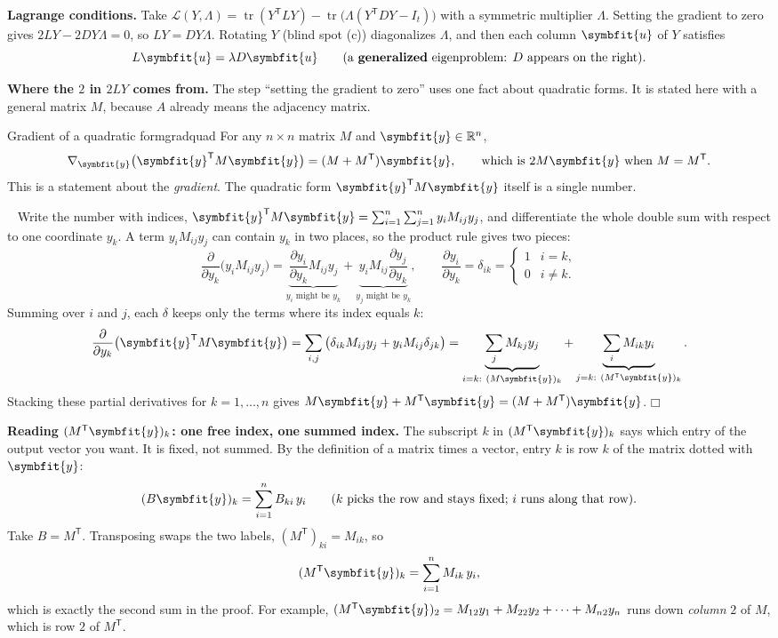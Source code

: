 \documentclass[11pt]{article}
\newcommand{\bm}[1]{\symbfit{#1}}
\newenvironment{proofsketch}{\par\noindent{\itshape Proof.}\ }{\hfill$\mdlgwhtsquare$\par}
\newcommand{\R}{\mathbb{R}}
\newcommand{\vu}{\bm{u}}
\newcommand{\T}{^{\mathsf T}}
\newcommand{\tr}{\operatorname{tr}}
\begin{document}
\textbf{Lagrange conditions.} Take $\mathcal L(Y,\Lambda)=\tr(Y\T LY)-\tr\big(\Lambda(Y\T DY-I_t)\big)$ with a symmetric multiplier
$\Lambda$. Setting the gradient to zero gives $2LY-2DY\Lambda=0$, so $LY=DY\Lambda$. Rotating $Y$ (blind spot (c)) diagonalizes $\Lambda$, and
then each column $\vu$ of $Y$ satisfies
\[
L\vu=\lambda D\vu\qquad(\text{a \textbf{generalized} eigenproblem: } D \text{ appears on the right}).
\]

\textbf{Where the $2$ in $2LY$ comes from.} The step ``setting the gradient to zero'' uses one fact about quadratic forms. It is stated here with a general matrix $M$, because $A$ already means the adjacency matrix.

\begin{proposition}{Gradient of a quadratic form}{gradquad}
For any $n\times n$ matrix $M$ and $\bm y\in\R^n$,
\[
\nabla_{\bm y}\big(\bm y\T M\bm y\big)=(M+M\T)\bm y,\qquad\text{which is } 2M\bm y \text{ when } M=M\T .
\]
This is a statement about the \emph{gradient}. The quadratic form $\bm y\T M\bm y$ itself is a single number.
\end{proposition}
\begin{proofsketch}
Write the number with indices, $\bm y\T M\bm y=\sum_{i=1}^n\sum_{j=1}^ny_iM_{ij}y_j$, and differentiate the whole double sum with respect to one coordinate $y_k$. A term $y_iM_{ij}y_j$ can contain $y_k$ in two places, so the product rule gives two pieces:
\[
\frac{\partial}{\partial y_k}\big(y_iM_{ij}y_j\big)=\underbrace{\frac{\partial y_i}{\partial y_k}M_{ij}y_j}_{y_i\text{ might be }y_k}+\underbrace{y_iM_{ij}\frac{\partial y_j}{\partial y_k}}_{y_j\text{ might be }y_k},
\qquad
\frac{\partial y_i}{\partial y_k}=\delta_{ik}=\begin{cases}1&i=k,\\0&i\ne k.\end{cases}
\]
Summing over $i$ and $j$, each $\delta$ keeps only the terms where its index equals $k$:
\[
\frac{\partial}{\partial y_k}\big(\bm y\T M\bm y\big)=\sum_{i,j}\big(\delta_{ik}M_{ij}y_j+y_iM_{ij}\delta_{jk}\big)
=\underbrace{\sum_jM_{kj}y_j}_{i=k:\ (M\bm y)_k}+\underbrace{\sum_iM_{ik}y_i}_{j=k:\ (M\T\bm y)_k}.
\]
Stacking these partial derivatives for $k=1,\dots,n$ gives $M\bm y+M\T\bm y=(M+M\T)\bm y$.
\end{proofsketch}

\textbf{Reading $(M\T\bm y)_k$: one free index, one summed index.} The subscript $k$ in $(M\T\bm y)_k$ says which entry of the output vector you want. It is fixed, not summed. By the definition of a matrix times a vector, entry $k$ is row $k$ of the matrix dotted with $\bm y$:
\[
(B\bm y)_k=\sum_{i=1}^nB_{ki}\,y_i\qquad(k\text{ picks the row and stays fixed; }i\text{ runs along that row}).
\]
Take $B=M\T$. Transposing swaps the two labels, $(M\T)_{ki}=M_{ik}$, so
\[
(M\T\bm y)_k=\sum_{i=1}^nM_{ik}\,y_i ,
\]
which is exactly the second sum in the proof. For example, $(M\T\bm y)_2=M_{12}y_1+M_{22}y_2+\cdots+M_{n2}y_n$ runs down \emph{column} $2$ of $M$, which is row $2$ of $M\T$.
\end{document}
